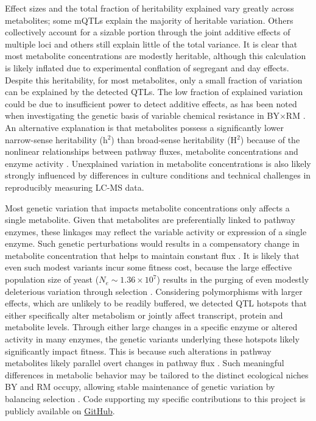 Effect sizes and the total fraction of heritability explained vary greatly across metabolites; some mQTLs explain the majority of heritable variation. Others collectively account for a sizable portion through the joint additive effects of multiple loci and others still explain little of the total variance.  It is clear that most metabolite concentrations are modestly heritable, although this calculation is likely inflated due to experimental conflation of segregant and day effects.  Despite this heritability, for most metabolites, only a small fraction of variation can be explained by the detected QTLs.  The low fraction of explained variation could be due to insufficient power to detect additive effects, as has been noted when investigating the genetic basis of variable chemical resistance in BY$\times$RM \cite{Bloom:2013bq}.  An alternative explanation is that metabolites possess a significantly lower narrow-sense heritability (h$^{2}$) than broad-sense heritability (H$^{2}$) because of the nonlinear relationships between pathway fluxes, metabolite concentrations and enzyme activity \cite{Kacser:1973fe, Rowe:2008ty}. Unexplained variation in metabolite concentrations is also likely strongly influenced by differences in culture conditions and technical challenges in reproducibly measuring LC-MS data. 

Most genetic variation that impacts metabolite concentrations only affects a single metabolite.  Given that metabolites are preferentially linked to pathway enzymes, these linkages may reflect the variable activity or expression of a single enzyme. Such genetic perturbations would results in a compensatory change in metabolite concentration that helps to maintain constant flux \cite{Fendt:2010gr}. It is likely that even such modest variants incur some fitness cost, because the large effective population size of yeast ($N_{e} \sim 1.36 \times 10^{7}$) results in the purging of even modestly deleterious variation through selection \cite{Hartl:2007fy,Ohta:1973ub,Wagner:2005cn}. Considering polymorphisms with larger effects, which are unlikely to be readily buffered, we detected QTL hotspots that either specifically alter metabolism or jointly affect transcript, protein and metabolite levels.  Through either large changes in a specific enzyme or altered activity in many enzymes, the genetic variants underlying these hotspots likely significantly impact fitness. This is because such alterations in pathway metabolites likely parallel overt changes in pathway flux \cite{Dykhuizen:1987uq}. Such meaningful differences in metabolic behavior may be tailored to the distinct ecological niches BY and RM occupy, allowing stable maintenance of genetic variation by balancing selection \cite{Hartl:2007fy}. Code supporting my specific contributions to this project is publicly available on \href{https://github.com/shackett/mQTL}{GitHub}.

